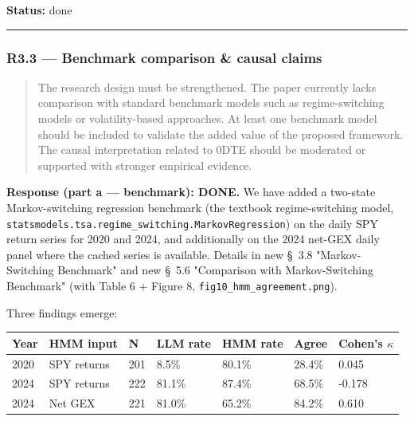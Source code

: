 \documentclass[11pt,a4paper]{article}
\begin{document}
\textbf{Status:} done

\bigskip\hrule\bigskip

\subsubsection*{R3.3 --- Benchmark comparison \& causal claims}

\begin{quote}
The research design must be strengthened. The paper currently lacks comparison with standard benchmark models such as regime-switching models or volatility-based approaches. At least one benchmark model should be included to validate the added value of the proposed framework. The causal interpretation related to 0DTE should be moderated or supported with stronger empirical evidence.
\end{quote}

\textbf{Response (part a --- benchmark): DONE.} We have added a two-state
Markov-switching regression benchmark (the textbook regime-switching
model, \texttt{statsmodels.tsa.regime\_switching.MarkovRegression}) on the
daily SPY return series for 2020 and 2024, and additionally on the
2024 net-GEX daily panel where the cached series is available. Details
in new \S{}~3.8 "Markov-Switching Benchmark" and new \S{}~5.6 "Comparison
with Markov-Switching Benchmark" (with Table 6 + Figure 8,
\texttt{fig10\_hmm\_agreement.png}).

Three findings emerge:

\begin{table}[H]
\centering
\small
\begin{tabular}{|l|l|l|l|l|l|l|}
\hline
\textbf{Year} & \textbf{HMM input} & \textbf{N} & \textbf{LLM rate} & \textbf{HMM rate} & \textbf{Agree} & \textbf{Cohen's $\kappa$} \\ \hline
2020 & SPY returns & 201 & 8.5\% & 80.1\% & 28.4\% & 0.045 \\ \hline
2024 & SPY returns & 222 & 81.1\% & 87.4\% & 68.5\% & -0.178 \\ \hline
2024 & Net GEX & 221 & 81.0\% & 65.2\% & 84.2\% & 0.610 \\ \hline
\end{tabular}
\end{table}
\end{document}

